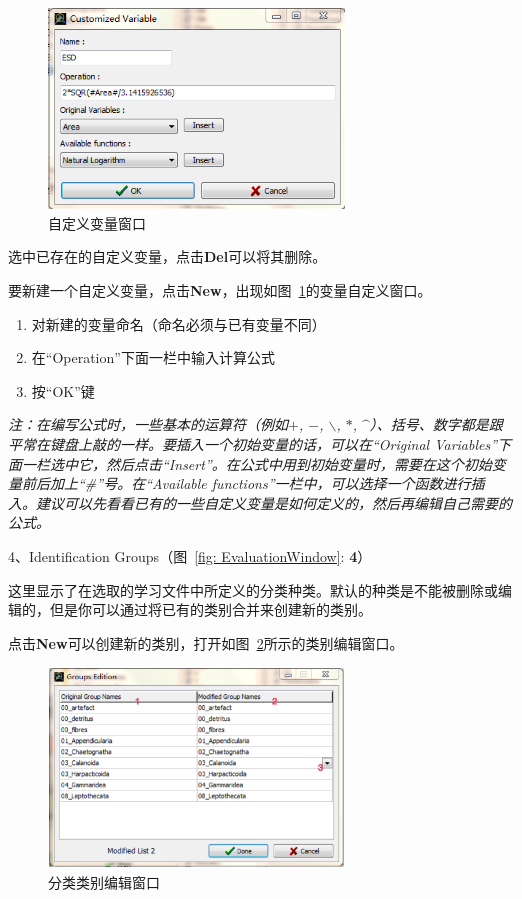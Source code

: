 \documentclass[12pt]{article}
\begin{document}
\begin{figure}[!ht]
\centering
\includegraphics[width=0.7\textwidth]{CustomizedVariableWindow.png}
\caption{自定义变量窗口}
\label{fig: CustomizedVariableWindow}
\end{figure}

选中已存在的自定义变量，点击\textbf{Del}可以将其删除。

要新建一个自定义变量，点击\textbf{New}，出现如图~\ref{fig: CustomizedVariableWindow}的变量自定义窗口。
\begin{enumerate}
\item 对新建的变量命名（命名必须与已有变量不同）
\item 在“Operation”下面一栏中输入计算公式
\item 按“OK”键
\end{enumerate}
{\color{blue}\textit{注：在编写公式时，一些基本的运算符（例如$+$, $-$, $\backslash$, $*$, $\^$）、括号、数字都是跟平常在键盘上敲的一样。要插入一个初始变量的话，可以在“Original Variables”下面一栏选中它，然后点击“Insert”。在公式中用到初始变量时，需要在这个初始变量前后加上“\#”号。在“Available functions”一栏中，可以选择一个函数进行插入。建议可以先看看已有的一些自定义变量是如何定义的，然后再编辑自己需要的公式。}}

4、Identification Groups（图~\ref{fig: EvaluationWindow}: {\color{red}\textbf{4}}）

这里显示了在选取的学习文件中所定义的分类种类。默认的种类是不能被删除或编辑的，但是你可以通过将已有的类别合并来创建新的类别。

点击\textbf{New}可以创建新的类别，打开如图~\ref{fig: GroupsEditionWindow}所示的类别编辑窗口。

\begin{figure}[!ht]
\centering
\includegraphics[width=0.7\textwidth]{GroupsEditionWindow.eps}
\caption{分类类别编辑窗口}
\label{fig: GroupsEditionWindow}
\end{figure}
\end{document}
